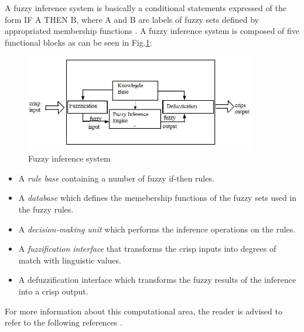 A fuzzy inference system is basically a conditional statements expressed of the form IF A THEN B, where A and B are labels of fuzzy sets defined by appropriated membership functions \cite{Zadeh1973}. A fuzzy inference system is composed of five functional blocks as can be seen in Fig.\ref{fig:FUZZY}:

\begin{figure}[h!]
\centering
\includegraphics[width=0.90\textwidth]{"Part 2 - Search-Based Optimization/Particle Swarm Optimization/Images/Fig. 1.8.png"}
\caption{Fuzzy inference system}
\label{fig:FUZZY}
\end{figure}

\begin{itemize}
\item A \textit{rule base} containing a number of fuzzy if-then rules.
\item A \textit{database} which defines the memebership functions of the fuzzy sets used in the fuzzy rules.
\item A \textit{decision-making unit} which performs the inference operations on the rules.
\item A \textit{fuzzification interface} that transforms the crisp inputs into degrees of match with linguistic values.
\item A defuzzification interface which transforms the fuzzy results of the inference into a crisp output.
\end{itemize}

For more information about this computational area, the reader is advised to refer to the following references \cite{Sugeno1985,Jang1993}.\\

